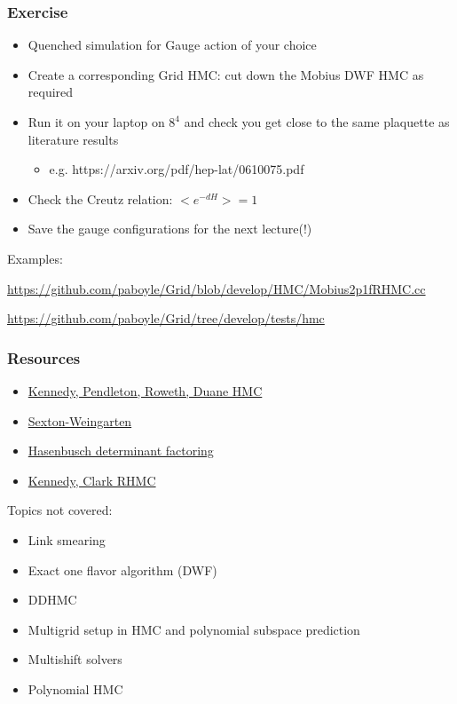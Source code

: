 \documentclass[pdf,ps,8pt]{beamer}
\newcommand{\link}[1]{\href{#1}{ {\color{blue} #1} }}
\begin{document}
\begin{frame}[fragile]\small\frametitle{Exercise}

\begin{itemize} 
\item Quenched simulation for Gauge action of your choice
\item Create a corresponding Grid HMC: cut down the Mobius DWF HMC as required
\item Run it on your laptop on $8^4$ and check you get close to the same plaquette as literature results
  \begin{itemize}
    \item e.g. https://arxiv.org/pdf/hep-lat/0610075.pdf
    \end{itemize}
\item Check the Creutz relation: $<e^{-dH}> = 1$
\item Save the gauge configurations for the next lecture(!)
\end{itemize}

Examples:

\link{https://github.com/paboyle/Grid/blob/develop/HMC/Mobius2p1fRHMC.cc}

\link{https://github.com/paboyle/Grid/tree/develop/tests/hmc}

\end{frame}


\begin{frame}[fragile]\small\frametitle{Resources}

\begin{itemize}
\item \href{https://inspirehep.net/literature/254077}{\color{blue}Kennedy, Pendleton, Roweth, Duane HMC}
\item \href{https://inspirehep.net/literature/31867}{\color{blue}Sexton-Weingarten}
\item \href{https://inspirehep.net/literature/560630}{\color{blue}Hasenbusch determinant factoring}
\item \href{https://inspirehep.net/literature/628174}{\color{blue}Kennedy, Clark RHMC}
\end{itemize}

Topics not covered:

\begin{itemize}
  \item Link smearing
  \item Exact one flavor algorithm (DWF)
  \item DDHMC
  \item Multigrid setup in HMC and polynomial subspace prediction
  \item Multishift solvers
  \item Polynomial HMC
\end{itemize}

\end{frame}
\end{document}
